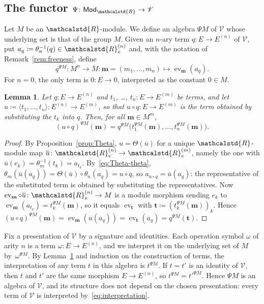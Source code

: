 \documentclass[reqno,a4paper]{amsart}
\theoremstyle{plain}
\newtheorem{lemma}[subsection]{Lemma}
\theoremstyle{definition}
\newcommand{\DefEq}{\coloneq}
\newcommand{\V}{\ensuremath{\mathcal{V}}}
\newcommand{\R}{\ensuremath{\mathcalstd{R}}}
\newcommand{\Mod}{\ensuremath{\mathsf{Mod}}}
\DeclareMathOperator{\ev}{ev}
\renewcommand{\Re}{\ensuremath{\R_{e}}}
\begin{document}
\subsection{The functor \texorpdfstring{\(\Psi\colon \Mod_{\R}\to\V\)}{Psi}}\label{sec:Psi}
Let \(M\) be an \(\R\)-module. We define an algebra \(\Psi M\) of \(\V\) whose underlying set is that of the group \(M\). Given an \(n\)-ary term \(q\colon {E\to E^{(n)}}\) of \(\V\), put \(a_{q}\DefEq\theta_{n}^{-1}(q)\in\Re^{(n)}\) and, with the notation of Remark~\ref{rem:freeness}, define
\begin{equation}\label{eq:interpretation}
  q^{\Psi M}\colon M^{n}\to M\colon \mathbf{m}=(m_{1},\dots,m_{n})\mapsto\ev_{\mathbf{m}}(a_{q})\text{.}
\end{equation}
For \(n=0\), the only term is \(0\colon E\to 0\), interpreted as the constant \(0\in M\).

\begin{lemma}\label{lem:substitution}
  Let \(q\colon E\to E^{(n)}\) and \(t_{1}\), \dots, \(t_{n}\colon E\to E^{(m)}\) be terms, and let \(u\DefEq\langle t_{1},\dots,t_{n}\rangle\colon E^{(n)}\to E^{(m)}\), so that \(u\circ q\colon E\to E^{(m)}\) is the term obtained by substituting the \(t_{k}\) into \(q\). Then, for all \(\mathbf{m}\in M^{m}\),
  \[
    (u\circ q)^{\Psi M}(\mathbf{m})=q^{\Psi M}\bigl(t_{1}^{\Psi M}(\mathbf{m}),\dots,t_{n}^{\Psi M}(\mathbf{m})\bigr)\text{.}
  \]
\end{lemma}
\begin{proof}
  By Proposition~\ref{prop:Theta}, \(u=\Theta(\overline{u})\) for a unique \(\R\)-module map \(\overline{u}\colon \Re^{(n)}\to\Re^{(m)}\), namely the one with \(\overline{u}(e_{k})=\theta_{m}^{-1}(t_{k})=a_{t_{k}}\). By~\eqref{eq:Theta-theta}, \(\theta_{m}(\overline{u}(a_{q}))=\Theta(\overline{u})\circ\theta_{n}(a_{q})=u\circ q\), so \(a_{u\circ q}=\overline{u}(a_{q})\): the representative of the substituted term is obtained by substituting the representatives. Now \(\ev_{\mathbf{m}}\circ\overline{u}\colon \Re^{(n)}\to M\) is a module morphism sending \(e_{k}\) to \(\ev_{\mathbf{m}}(a_{t_{k}})=t_{k}^{\Psi M}(\mathbf{m})\), so it equals \(\ev_{\mathbf{t}}\) with \(\mathbf{t}\DefEq(t_{k}^{\Psi M}(\mathbf{m}))_{k}\). Hence \((u\circ q)^{\Psi M}(\mathbf{m})=\ev_{\mathbf{m}}(\overline{u}(a_{q}))=\ev_{\mathbf{t}}(a_{q})=q^{\Psi M}(\mathbf{t})\).
\end{proof}

Fix a presentation of \(\V\) by a signature and identities. Each operation symbol \(\omega\) of arity \(n\) is a term \(\omega\colon E\to E^{(n)}\), and we interpret it on the underlying set of \(M\) by~\(\omega^{\Psi M}\). By Lemma~\ref{lem:substitution} and induction on the construction of terms, the interpretation of any term \(t\) in this algebra is \(t^{\Psi M}\). If \(t=t'\) is an identity of \(\V\), then \(t\) and \(t'\) are the same morphism \(E\to E^{(n)}\), so \(t^{\Psi M}=t'^{\Psi M}\). Hence \(\Psi M\) is an algebra of \(\V\), and its structure does not depend on the chosen presentation: every term of \(\V\) is interpreted by~\eqref{eq:interpretation}.
\end{document}
